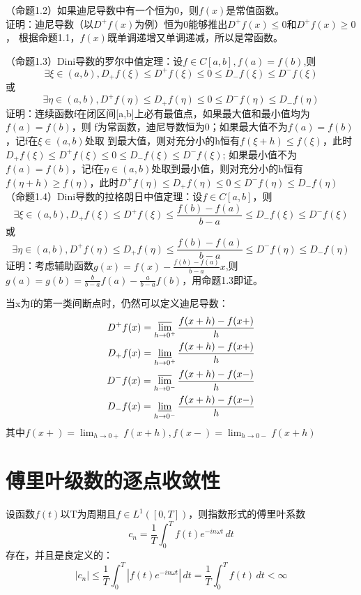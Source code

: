 \documentclass{ctexart}
\begin{document}
（命题1.2）如果迪尼导数中有一个恒为0，则$f(x)$是常值函数。\\
证明：迪尼导数（以$D^+f(x)$为例）恒为0能够推出$D^+f(x)\leq 0$和$D^+f(x)\geq 0$，
根据命题1.1，$f(x)$既单调递增又单调递减，所以是常函数。

（命题1.3）Dini导数的罗尔中值定理：设$f\in C[a,b],f(a)=f(b)$,则\[\exists\xi\in (a,b),D_+f(\xi)\leq D^+f(\xi)\leq 0\leq D_-f(\xi)\leq D^-f(\xi)\]
或\[\exists\eta\in (a,b),D^+f (\eta)\leq D_+f (\eta)\leq 0\leq D^-f(\eta)\leq D_-f(\eta)\]
证明：连续函数f在闭区间[a,b]上必有最值点，如果最大值和最小值均为$f(a)=f(b)$，则
f为常函数，迪尼导数恒为0；如果最大值不为$f(a)=f(b)$，记f在$\xi\in (a,b)$处取
到最大值，则对充分小的h恒有$f(\xi +h)\leq f(\xi)$，此时
$D_+f(\xi)\leq D^+f(\xi)\leq 0\leq D_-f(\xi)\leq D^-f(\xi)$;
如果最小值不为$f(a)=f(b)$，记f在$\eta\in (a,b)$处取到最小值，则对充分小的h恒有
$f(\eta +h)\geq f(\eta)$，此时$D^+f (\eta)\leq D_+f (\eta)\leq 0\leq D^-f(\eta)\leq D_-f(\eta)$\\

（命题1.4）Dini导数的拉格朗日中值定理：设$f\in C[a,b]$，则
\[\exists\xi\in (a,b),D_+f(\xi)\leq D^+f(\xi)\leq \frac{f(b)-f(a)}{b-a}\leq D_-f(\xi)\leq D^-f(\xi)\]
或\[\exists\eta\in (a,b),D^+f (\eta)\leq D_+f (\eta)\leq \frac{f(b)-f(a)}{b-a}\leq D^-f(\eta)\leq D_-f(\eta)\]
证明：考虑辅助函数$g(x)=f(x)-\frac{f(b)-f(a)}{b-a}x$,则
$g(a)=g(b)=\frac{b}{b-a}f(a)-\frac{a}{b-a}f(b)$，用命题1.3即证。

当x为f的第一类间断点时，仍然可以定义迪尼导数：
\begin{align}
    D^+f(x)=\varlimsup_{h\to 0^+}\frac{f(x+h)-f(x+)}{h} \\
    D_+f(x)=\varliminf_{h\to 0^+}\frac{f(x+h)-f(x+)}{h} \\
    D^-f(x)=\varlimsup_{h\to 0^-}\frac{f(x+h)-f(x-)}{h} \\
    D_-f(x)=\varliminf_{h\to 0^-}\frac{f(x+h)-f(x-)}{h}
\end{align}
其中$f(x+)=\lim_{h\to 0+}f(x+h),f(x-)=\lim_{h\to 0-}f(x+h)$

\section{傅里叶级数的逐点收敛性}
设函数$f(t)$以T为周期且$f\in L^1([0,T])$，则指数形式的傅里叶系数
\[c_n=\frac{1}{T}\int_{0}^{T}f(t)e^{-in\omega t}\,dt\]存在，并且是良定义的：
\[|c_n|\leq \frac{1}{T}\int_{0}^{T}|f(t)e^{-in\omega t}|\,dt=\frac{1}{T}\int_{0}^{T}f(t)\,dt<\infty \]
\end{document}
